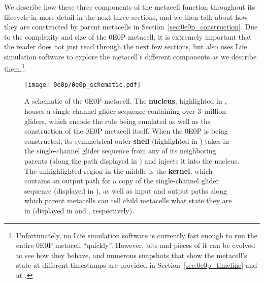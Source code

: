 We describe how these three components of the metacell function throughout its lifecycle in more detail in the next three sections, and we then talk about how they are constructed by parent metacells in Section~\ref{sec:0e0p_construction}. Due to the complexity and size of the 0E0P metacell, it is extremely important that the reader does not just read through the next few sections, but also uses Life simulation software to explore the metacell's different components as we describe them.\footnote{Unfortunately, no Life simulation software is currently fast enough to run the entire 0E0P metacell ``quickly''. However, bits and pieces of it can be evolved to see how they behave, and numerous snapshots that show the metacell's state at different timestamps are provided in Section~\ref{sec:0e0p_timeline} and at .}

\begin{figure}[!htb]
	\centering
	\texttt{[image: 0e0p/0e0p\_schematic.pdf]}
	\caption{A schematic of the 0E0P metacell. The \textbf{nucleus}, highlighted in , houses a single-channel glider sequence containing over 3~million gliders, which encode the rule being emulated as well as the construction of the 0E0P metacell itself. When the 0E0P is being constructed, its symmetrical outer \textbf{shell} (highlighted in ) takes in the single-channel glider sequence from any of its neighboring parents (along the path displayed in ) and injects it into the nucleus. The unhighlighted region in the middle is the \textbf{kernel}, which contains an output path for a copy of the single-channel glider sequence (displayed in ), as well as input and output paths along which parent metacells can tell child metacells what state they are in (displayed in  and , respectively).}\label{fig:0e0p_schematic}
\end{figure}

